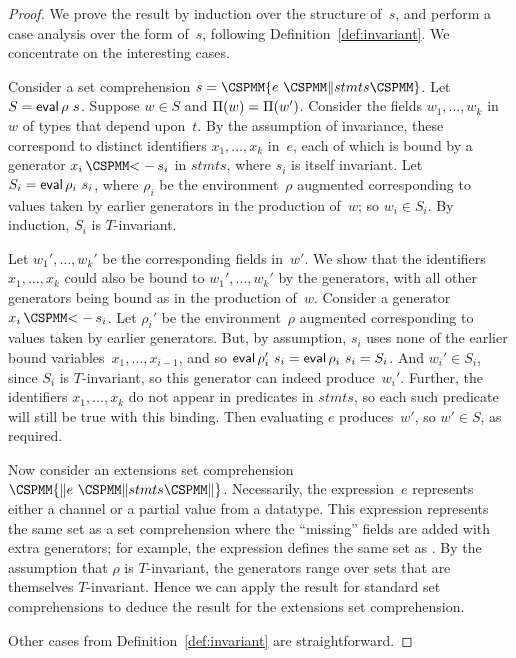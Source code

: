 \begin{proof}
We prove the result by induction over the structure of~$s$, and perform a case
analysis over the form of~$s$, following Definition~\ref{def:invariant}.  We
concentrate on the interesting cases.

Consider a set comprehension $s = \M\{ e ~ \M\| stmts \M\}$.  Let $S = \mathop{\sf eval}
\rho~s$.  Suppose $w \in S$ and $\Pi(w) = \Pi(w')$.  Consider the fields
$w_1,\ldots,w_k$ in~$w$ of types that depend upon~$t$.  By the assumption of
invariance, these correspond to distinct identifiers $x_1,\ldots,x_k$ in~$e$,
each of which is bound by a generator $x_i \,\M{<-}\, s_i$ in $stmts$, where
$s_i$ is itself invariant.  Let $S_i = \mathop{\sf eval} \rho_i~s_i$, where $\rho_i$ be
the environment~$\rho$ augmented corresponding to values taken by earlier
generators in the production of~$w$; so $w_i \in S_i$.  By induction, $S_i$ is
$T$-invariant.

Let $w_1',\ldots,w_k'$ be the corresponding fields in~$w'$.  We show that the
identifiers $x_1,\ldots,x_k$ could also be bound to $w_1',\ldots,w_k'$ by the
generators, with all other generators being bound as in the production of~$w$.
Consider a generator $x_i \,\M{<-}\, s_i$.  Let $\rho_i'$ be the
environment~$\rho$ augmented corresponding to values taken by earlier
generators.  But, by assumption, $s_i$ uses none of the earlier bound
variables~$x_1,\ldots,x_{i-1}$, and so $\mathop{\sf eval} \rho_i'~s_i = \mathop{\sf eval} \rho_i~s_i =
S_i$.  And $w_i' \in S_i$, since $S_i$ is $T$-invariant, so this generator can
indeed produce~$w_i'$.  Further, the identifiers $x_1,\ldots,x_k$ do not
appear in predicates in $stmts$, so each such predicate will still be true
with this binding.  Then evaluating $e$ produces~$w'$, so $w' \in S$, as
required.

Now consider an extensions set comprehension $\M{\{\|} e ~ \M\| stmts \M{\|\}}$.
Necessarily, the expression~$e$ represents either a channel or a partial value
from a datatype.  This expression represents the same set as a set
comprehension where the ``missing'' fields are added with extra generators;
for example, the expression   defines the same set as
.  By the assumption that $\rho$ is
$T$-invariant, the generators range over sets that are themselves
$T$-invariant.  Hence we can apply the result for standard set comprehensions
to deduce the result for the extensions set comprehension. 

Other cases from Definition~\ref{def:invariant} are straightforward.
\end{proof}




